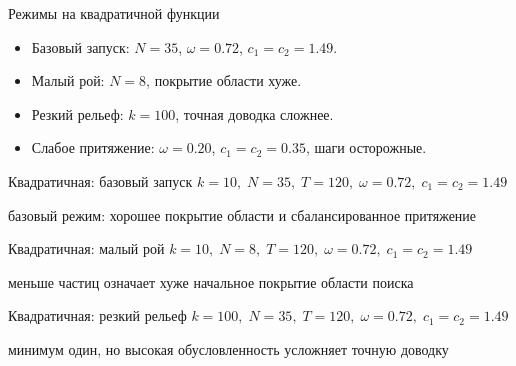 \documentclass[aspectratio=169,11pt]{beamer}
\begin{document}
\begin{frame}{Режимы на квадратичной функции}
    \large
    \begin{itemize}
        \item Базовый запуск: \(N=35\), \(\omega=0.72\), \(c_1=c_2=1.49\).
        \item Малый рой: \(N=8\), покрытие области хуже.
        \item Резкий рельеф: \(k=100\), точная доводка сложнее.
        \item Слабое притяжение: \(\omega=0.20\), \(c_1=c_2=0.35\), шаги осторожные.
    \end{itemize}
\end{frame}

\begin{frame}{Квадратичная: базовый запуск}
    \centering
    \small
    \(k=10,\; N=35,\; T=120,\; \omega=0.72,\; c_1=c_2=1.49\)

    \footnotesize базовый режим: хорошее покрытие области и сбалансированное притяжение
    \vspace{0.1cm}

\end{frame}

\begin{frame}{Квадратичная: малый рой}
    \centering
    \small
    \(k=10,\; N=8,\; T=120,\; \omega=0.72,\; c_1=c_2=1.49\)

    \footnotesize меньше частиц означает хуже начальное покрытие области поиска
    \vspace{0.1cm}

\end{frame}

\begin{frame}{Квадратичная: резкий рельеф}
    \centering
    \small
    \(k=100,\; N=35,\; T=120,\; \omega=0.72,\; c_1=c_2=1.49\)

    \footnotesize минимум один, но высокая обусловленность усложняет точную доводку
    \vspace{0.1cm}

\end{frame}
\end{document}
